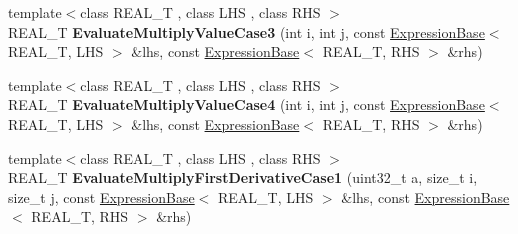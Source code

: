 \begin{DoxyCompactItemize}
\item 
\hypertarget{namespaceatl_a73390c822a824e670262f1b3feea9e2e}{{\footnotesize template$<$class R\+E\+A\+L\+\_\+\+T , class L\+H\+S , class R\+H\+S $>$ }\\R\+E\+A\+L\+\_\+\+T {\bfseries Evaluate\+Multiply\+Value\+Case3} (int i, int j, const \hyperlink{structatl_1_1_expression_base}{Expression\+Base}$<$ R\+E\+A\+L\+\_\+\+T, L\+H\+S $>$ \&lhs, const \hyperlink{structatl_1_1_expression_base}{Expression\+Base}$<$ R\+E\+A\+L\+\_\+\+T, R\+H\+S $>$ \&rhs)}\label{namespaceatl_a73390c822a824e670262f1b3feea9e2e}

\item 
\hypertarget{namespaceatl_a42607fdb24b11d2453fb6e396833d2d4}{{\footnotesize template$<$class R\+E\+A\+L\+\_\+\+T , class L\+H\+S , class R\+H\+S $>$ }\\R\+E\+A\+L\+\_\+\+T {\bfseries Evaluate\+Multiply\+Value\+Case4} (int i, int j, const \hyperlink{structatl_1_1_expression_base}{Expression\+Base}$<$ R\+E\+A\+L\+\_\+\+T, L\+H\+S $>$ \&lhs, const \hyperlink{structatl_1_1_expression_base}{Expression\+Base}$<$ R\+E\+A\+L\+\_\+\+T, R\+H\+S $>$ \&rhs)}\label{namespaceatl_a42607fdb24b11d2453fb6e396833d2d4}

\item 
\hypertarget{namespaceatl_a8e22842340af0fb9575502846b8d1107}{{\footnotesize template$<$class R\+E\+A\+L\+\_\+\+T , class L\+H\+S , class R\+H\+S $>$ }\\R\+E\+A\+L\+\_\+\+T {\bfseries Evaluate\+Multiply\+First\+Derivative\+Case1} (uint32\+\_\+t a, size\+\_\+t i, size\+\_\+t j, const \hyperlink{structatl_1_1_expression_base}{Expression\+Base}$<$ R\+E\+A\+L\+\_\+\+T, L\+H\+S $>$ \&lhs, const \hyperlink{structatl_1_1_expression_base}{Expression\+Base}$<$ R\+E\+A\+L\+\_\+\+T, R\+H\+S $>$ \&rhs)}\label{namespaceatl_a8e22842340af0fb9575502846b8d1107}


\end{DoxyCompactItemize}
